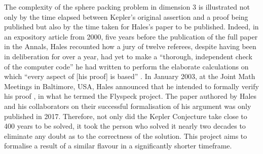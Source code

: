 The complexity of the sphere packing problem in dimension $3$ is illustrated not only by the time elapsed between Kepler's original assertion and a proof being published but also by the time taken for Hales's paper to be published. Indeed, in an expository article from 2000, five years before the publication of the full paper in the Annals, Hales recounted how a jury of twelve referees, despite having been in deliberation for over a year, had yet to make a ``thorough, independent check of the computer code'' he had written to perform the elaborate calculations on which ``every aspect of [his proof] is based'' \cite{CannonHoney}. In January 2003, at the Joint Math Meetings in Baltimore, USA, Hales announced that he intended to formally verify his proof \cite{HalesKeplerFormal}, in what he termed the Flyspeck project. The paper authored by Hales and his collaborators on their successful formalisation of his argument was only published in 2017. Therefore, not only did the Kepler Conjecture take close to 400 years to be solved, it took the person who solved it nearly two decades to eliminate any doubt as to the correctness of the solution. This project aims to formalise a result of a similar flavour in a significantly shorter timeframe.